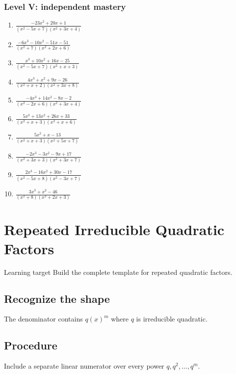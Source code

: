\documentclass[11pt,oneside]{book}
\begin{document}
\subsection*{Level V: independent mastery}
\begin{enumerate}[leftmargin=*,label=\textbf{\arabic*.},itemsep=0.65\baselineskip]
\item $\displaystyle \frac{- 23 x^{2} + 20 x + 1}{\left(x^{2} - 5 x + 7\right) \left(x^{2} + 3 x + 4\right)}$
\item $\displaystyle \frac{- 6 x^{3} - 10 x^{2} - 51 x - 51}{\left(x^{2} + 7\right) \left(x^{2} + 2 x + 6\right)}$
\item $\displaystyle \frac{x^{3} + 10 x^{2} + 16 x - 25}{\left(x^{2} - 5 x + 7\right) \left(x^{2} + x + 3\right)}$
\item $\displaystyle \frac{4 x^{3} + x^{2} + 9 x - 26}{\left(x^{2} + x + 2\right) \left(x^{2} + 3 x + 8\right)}$
\item $\displaystyle \frac{- 4 x^{3} + 14 x^{2} - 8 x - 2}{\left(x^{2} - 2 x + 6\right) \left(x^{2} + 3 x + 4\right)}$
\item $\displaystyle \frac{5 x^{3} + 13 x^{2} + 26 x + 33}{\left(x^{2} + x + 3\right) \left(x^{2} + x + 6\right)}$
\item $\displaystyle \frac{5 x^{2} + x - 13}{\left(x^{2} + x + 3\right) \left(x^{2} + 5 x + 7\right)}$
\item $\displaystyle \frac{- 2 x^{3} - 3 x^{2} - 9 x + 17}{\left(x^{2} + 3 x + 3\right) \left(x^{2} + 3 x + 7\right)}$
\item $\displaystyle \frac{2 x^{3} - 16 x^{2} + 30 x - 17}{\left(x^{2} - 5 x + 8\right) \left(x^{2} - 3 x + 7\right)}$
\item $\displaystyle \frac{3 x^{3} + x^{2} - 46}{\left(x^{2} + 8\right) \left(x^{2} + 2 x + 3\right)}$
\end{enumerate}
\chapter{Repeated Irreducible Quadratic Factors}
\begin{rulebox}{Learning target}
Build the complete template for repeated quadratic factors.
\end{rulebox}
\section{Recognize the shape}
The denominator contains $q(x)^m$ where $q$ is irreducible quadratic.
\section{Procedure}
Include a separate linear numerator over every power $q,q^2,\ldots,q^m$.
\end{document}
